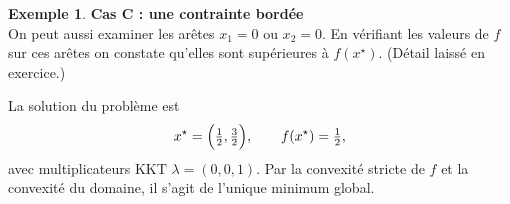 \documentclass[a4paper,12pt,openany]{book}
\theoremstyle{plain}
\theoremstyle{definition}
\newtheorem{example}[theorem]{Exemple}
\theoremstyle{remark}
\theoremstyle{nbstyle}
\begin{document}
\begin{example}
		\textbf{Cas C : une contrainte bordée}\\
		On peut aussi examiner les ar\^etes $x_1=0$ ou $x_2=0$. En v\'erifiant les valeurs de $f$ sur ces ar\^etes on constate qu'elles sont sup\'erieures \`a $f(x^\star)$. (D\'etail laiss\'e en exercice.)
		
		La solution du problème est
		\[x^\star=\Bigl(\tfrac12,\tfrac32\Bigr),\qquad f(x^\star)=\tfrac12,
		\]
		avec multiplicateurs KKT $\lambda=(0,0,1)$. Par la convexit\'e stricte de $f$ et la convexit\'e du domaine, il s'agit de l'unique minimum global.
		
	\end{example}
	
\end{document}
